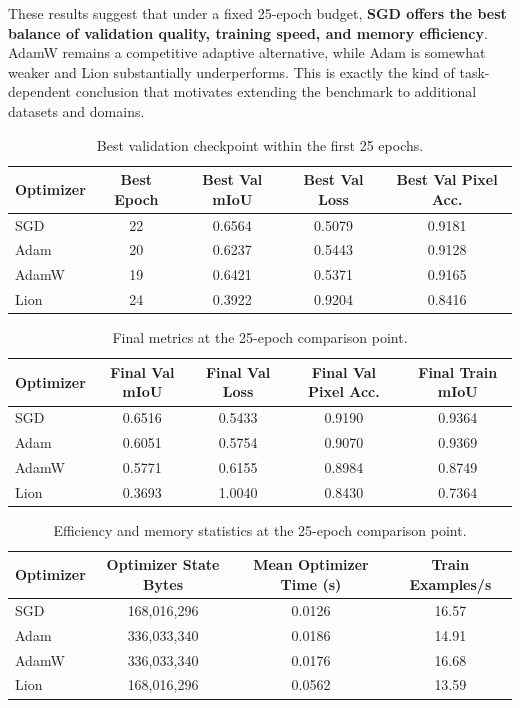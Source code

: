 \documentclass[10pt]{article}
\begin{document}
These results suggest that under a fixed 25-epoch budget, \textbf{SGD offers the best balance of validation quality, training speed, and memory efficiency}. AdamW remains a competitive adaptive alternative, while Adam is somewhat weaker and Lion substantially underperforms. This is exactly the kind of task-dependent conclusion that motivates extending the benchmark to additional datasets and domains.

\begin{table}[H]
\centering
\caption{Best validation checkpoint within the first 25 epochs.}
\begin{tabular}{lcccc}
\toprule
Optimizer & Best Epoch & Best Val mIoU & Best Val Loss & Best Val Pixel Acc. \\
\midrule
SGD   & 22 & 0.6564 & 0.5079 & 0.9181 \\
Adam  & 20 & 0.6237 & 0.5443 & 0.9128 \\
AdamW & 19 & 0.6421 & 0.5371 & 0.9165 \\
Lion  & 24 & 0.3922 & 0.9204 & 0.8416 \\
\bottomrule
\end{tabular}
\end{table}

\begin{table}[H]
\centering
\caption{Final metrics at the 25-epoch comparison point.}
\begin{tabular}{lcccc}
\toprule
Optimizer & Final Val mIoU & Final Val Loss & Final Val Pixel Acc. & Final Train mIoU \\
\midrule
SGD   & 0.6516 & 0.5433 & 0.9190 & 0.9364 \\
Adam  & 0.6051 & 0.5754 & 0.9070 & 0.9369 \\
AdamW & 0.5771 & 0.6155 & 0.8984 & 0.8749 \\
Lion  & 0.3693 & 1.0040 & 0.8430 & 0.7364 \\
\bottomrule
\end{tabular}
\end{table}

\begin{table}[H]
\centering
\caption{Efficiency and memory statistics at the 25-epoch comparison point.}
\begin{tabular}{lccc}
\toprule
Optimizer & Optimizer State Bytes & Mean Optimizer Time (s) & Train Examples/s \\
\midrule
SGD   & 168,016,296 & 0.0126 & 16.57 \\
Adam  & 336,033,340 & 0.0186 & 14.91 \\
AdamW & 336,033,340 & 0.0176 & 16.68 \\
Lion  & 168,016,296 & 0.0562 & 13.59 \\
\bottomrule
\end{tabular}
\end{table}
\end{document}
